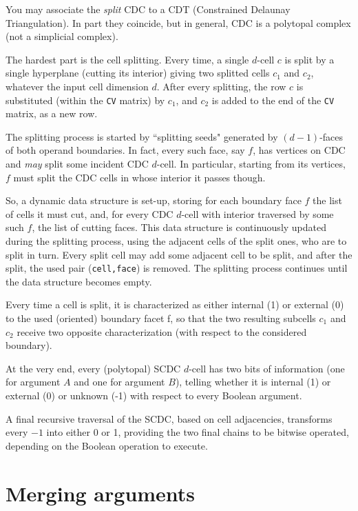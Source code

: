 \documentclass[11pt,oneside]{article}	%
\begin{document}
You may associate the \emph{split} CDC to a CDT (Constrained Delaunay Triangulation).  In part they coincide, but in general, CDC is a polytopal complex (not a simplicial complex).


The hardest part is the cell splitting.  
Every time, a single $d$-cell  $c$  is split by a single hyperplane (cutting its interior)  giving two splitted cells $c_1$ and $c_2$, 
whatever the input cell dimension $d$.  After every splitting, the row $c$ is substituted (within the \texttt{CV} matrix) by $c_1$, and $c_2$ is 
added to the end of the \texttt{CV} matrix, as a new row.

The splitting process is started by ``splitting seeds" generated by $(d-1)$-faces of both operand boundaries.
In fact, every such face, say $f$, has vertices on CDC and \emph{may} split some incident CDC $d$-cell.  In particular, starting from its vertices,
$f$ must split the CDC cells in whose interior it passes though.

So, a dynamic data structure is set-up, storing for each boundary face $f$ the list of cells it must cut, and, for every CDC $d$-cell with interior traversed
by some such $f$, the list of cutting faces.  This data structure is continuously updated during the splitting process, using the 
adjacent cells of the split ones, who are to split in turn.  Every split cell may add some adjacent cell to be split, and after the split,
the used pair (\texttt{cell,face}) is removed.  The splitting process continues until the data structure becomes empty.

Every time a cell is split, it is characterized as either internal (1) or external (0) to the used (oriented) boundary facet f, so that the two 
resulting subcells $c_1$ and $c_2$  receive two opposite characterization (with respect to the considered boundary).

At the very end, every (polytopal) SCDC $d$-cell has two bits of information (one for argument $A$ and one for argument $B$), telling whether it is internal  (1) or external (0) or unknown (-1) with respect to every Boolean argument.

A final recursive traversal of the SCDC, based on cell adjacencies, transforms every $-1$ into either 0 or 1, providing the two final chains to be bitwise operated, depending on the Boolean operation to execute.


\section{Merging arguments}
\end{document}

